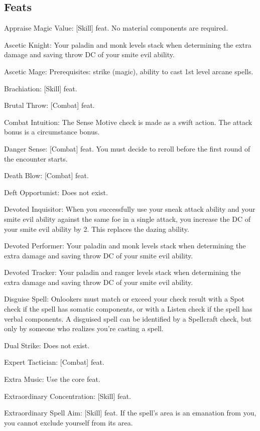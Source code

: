 \subsection{Feats}
\begin{itemize*}
\item Appraise Magic Value: [Skill] feat. No material components are required.
\item Ascetic Knight: Your paladin and monk levels stack when determining the extra damage and saving throw DC of your smite evil ability.
\item Ascetic Mage: Prerequisites: \Ki strike (magic), ability to cast 1st level arcane spells.
\item Brachiation: [Skill] feat.
\item Brutal Throw: [Combat] feat.
\item Combat Intuition: The Sense Motive check is made as a swift action. The attack bonus is a circumstance bonus.
\item Danger Sense: [Combat] feat. You must decide to reroll before the first round of the encounter starts.
\item Death Blow: [Combat] feat.
\item Deft Opportunist: Does not exist.
\item Devoted Inquisitor: When you successfully use your sneak attack ability and your smite evil ability against the same foe in a single attack, you increase the DC of your smite evil ability by 2. This replaces the dazing ability.
\item Devoted Performer: Your paladin and monk levels stack when determining the extra damage and saving throw DC of your smite evil ability.
\item Devoted Tracker: Your paladin and ranger levels stack when determining the extra damage and saving throw DC of your smite evil ability.
\item Disguise Spell: Onlookers must match or exceed your check result with a Spot check if the spell has somatic components, or with a Listen check if the spell has verbal components. A disguised spell can be identified by a Spellcraft check, but only by someone who realizes you're casting a spell.
\item Dual Strike: Does not exist.
\item Expert Tactician: [Combat] feat.
\item Extra Music: Use the core feat.
\item Extraordinary Concentration: [Skill] feat.
\item Extraordinary Spell Aim: [Skill] feat. If the spell's area is an emanation from you, you cannot exclude yourself from its area.

\end{itemize*}
